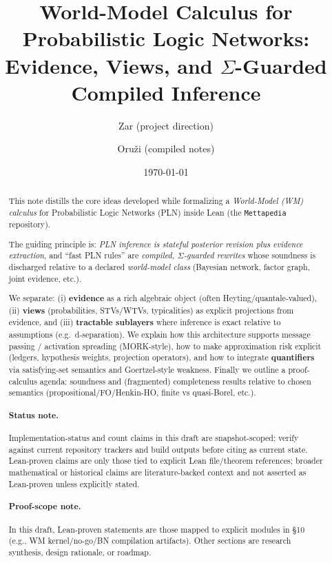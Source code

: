 \documentclass[11pt]{article}
\title{\vspace{-1.5em}
World-Model Calculus for Probabilistic Logic Networks:\\
Evidence, Views, and $\Sigma$-Guarded Compiled Inference
\vspace{-0.5em}}
\author{Zar (project direction) \and Oru\v{z}i (compiled notes)}
\date{\today}
\begin{document}
\maketitle

\begin{abstract}
This note distills the core ideas developed while formalizing a \emph{World-Model (WM) calculus}
for Probabilistic Logic Networks (PLN) inside Lean (the \texttt{Mettapedia} repository).

The guiding principle is: \emph{PLN inference is stateful posterior revision plus evidence extraction},
and ``fast PLN rules'' are \emph{compiled, $\Sigma$-guarded rewrites} whose soundness is discharged
relative to a declared \emph{world-model class} (Bayesian network, factor graph, joint evidence, etc.).

We separate:
(i) \textbf{evidence} as a rich algebraic object (often Heyting/quantale-valued),
(ii) \textbf{views} (probabilities, STVs/WTVs, typicalities) as explicit projections from evidence,
and
(iii) \textbf{tractable sublayers} where inference is exact relative to assumptions (e.g.\ d-separation).
We explain how this architecture supports message passing / activation spreading (MORK-style),
how to make approximation risk explicit (ledgers, hypothesis weights, projection operators),
and how to integrate \textbf{quantifiers} via satisfying-set semantics and Goertzel-style weakness.
Finally we outline a proof-calculus agenda: soundness and (fragmented) completeness results
relative to chosen semantics (propositional/FO/Henkin-HO, finite vs quasi-Borel, etc.).
\paragraph{Status note.} Implementation-status and count claims in this draft are snapshot-scoped; verify against current repository trackers and build outputs before citing as current state. Lean-proven claims are only those tied to explicit Lean file/theorem references; broader mathematical or historical claims are literature-backed context and not asserted as Lean-proven unless explicitly stated.
\paragraph{Proof-scope note.} In this draft, Lean-proven statements are those mapped to explicit modules in \S10 (e.g., WM kernel/no-go/BN compilation artifacts). Other sections are research synthesis, design rationale, or roadmap.
\end{abstract}
\end{document}
